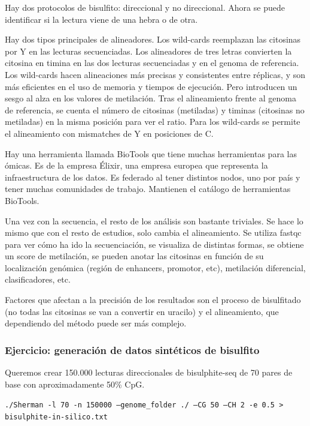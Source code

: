 Hay dos protocolos de bisulfito: direccional y no direccional. Ahora se puede identificar si la lectura viene de una hebra o de otra. 

Hay dos tipos principales de alineadores. Los wild-cards reemplazan las citosinas por Y en las lecturas secuenciadas. Los alineadores de tres letras convierten la citosina en timina en las dos lecturas secuenciadas y en el genoma de referencia. 
Los wild-cards hacen alineaciones más precisas y consistentes entre réplicas, y son más eficientes en el uso de memoria y tiempos de ejecución. Pero introducen un sesgo al alza en los valores de metilación. Tras el alineamiento frente al genoma de referencia, se cuenta el número de citosinas (metiladas) y timinas (citosinas no metiladas) en la misma posición para ver el ratio. Para los wild-cards se permite el alineamiento con mismatches de Y en posiciones de C. 

Hay una herramienta llamada BioTools que tiene muchas herramientas para las ómicas. Es de la empresa Élixir, una empresa europea que representa la infraestructura de los datos. Es federado al tener distintos nodos, uno por país y tener muchas comunidades de trabajo. Mantienen el catálogo de herramientas BioTools. 

Una vez con la secuencia, el resto de los análisis son bastante triviales. Se hace lo mismo que con el resto de estudios, solo cambia el alineamiento. Se utiliza fastqc para ver cómo ha ido la secuenciación, se visualiza de distintas formas, se obtiene un score de metilación, se pueden anotar las citosinas en función de su localización genómica (región de enhancers, promotor, etc), metilación diferencial, clasificadores, etc.

Factores que afectan a la precisión de los resultados son el proceso de bisulfitado (no todas las citosinas se van a convertir en uracilo) y el alineamiento, que dependiendo del método puede ser más complejo. 

\subsubsection{Ejercicio: generación de datos sintéticos de bisulfito}
Queremos crear 150.000 lecturas direccionales de bisulphite-seq de 70 pares de base con aproximadamente 50\% CpG. 

\texttt{./Sherman -l 70 -n 150000 --genome\_folder ./ --CG 50 --CH 2 -e 0.5 > bisulphite-in-silico.txt}
